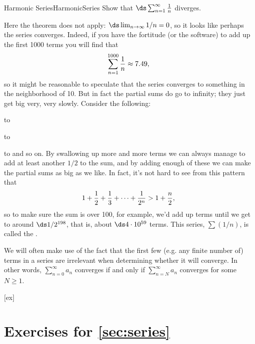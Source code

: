 \begin{example}{Harmonic Series}{HarmonicSeries}
Show that $\ds\sum_{n=1}^\infty {1\over n}$ diverges.
\end{example}
\begin{solution}
Here the theorem does not apply: $\ds\lim _{n\to\infty} 1/n=0$, so it
looks like perhaps the series converges. Indeed, if you have the
fortitude (or the software) to add up the first 1000 terms you will find that
$$\sum_{n=1}^{1000} {1\over n}\approx 7.49,$$
so it might be reasonable to speculate that the series converges to
something in the neighborhood of 10. But in fact the partial sums do go
to infinity; they just get big very, very slowly. Consider the
following:

\hbox to 

\hbox to 

\hbox to 
and so on. By swallowing up more and more terms we can always manage
to add at least another $1/2$ to the sum, and by adding enough of
these we can make the partial sums as big as we like. In fact, it's
not hard to see from this pattern that
$$1+{1\over 2}+{1\over 3}+\cdots+{1\over 2^n} > 1+{n\over 2},$$
so to make sure the sum is over 100, for example, we'd add
up terms until we get to around $\ds 1/2^{198}$, that is,
about $\ds 4\cdot 10^{59}$ terms. This series, $\sum (1/n)$, is called the
.
\end{solution}

We will often make use of the fact that the first few (e.g. any finite number of) terms in a series are irrelevant when determining whether it will converge. In other words, $\sum_{n=0}^{\infty}a_n$ converges if and only if $\sum_{n=N}^{\infty}a_n$ converges for some $N\geq 1$.

[ex]
\section*{Exercises for \ref{sec:series}}

